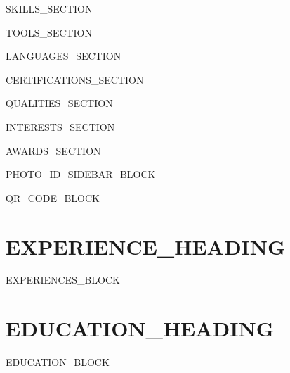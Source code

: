 \documentclass[9.5pt,a4paper]{article}
\begin{document}
\noindent
\colorbox{leftbg}{%
\begin{minipage}[t][\dimexpr\textheight-\pagetotal-0.4cm\relax][t]{0.35\textwidth}
\color{white}
\vspace{0.8em}

{{SKILLS_SECTION}}

{{TOOLS_SECTION}}

{{LANGUAGES_SECTION}}

{{CERTIFICATIONS_SECTION}}

{{QUALITIES_SECTION}}

{{INTERESTS_SECTION}}

{{AWARDS_SECTION}}

{{PHOTO_ID_SIDEBAR_BLOCK}}

\vfill
\vspace{0.15cm}
\begin{center}
{{QR_CODE_BLOCK}}
\end{center}

\end{minipage}%
}%
\hspace{0.35cm}%
\begin{minipage}[t]{0.58\textwidth}

\color{text}

\section*{ {{EXPERIENCE_HEADING}} }

{{EXPERIENCES_BLOCK}}

\section*{ {{EDUCATION_HEADING}} }

{{EDUCATION_BLOCK}}

\end{minipage}
\end{document}
